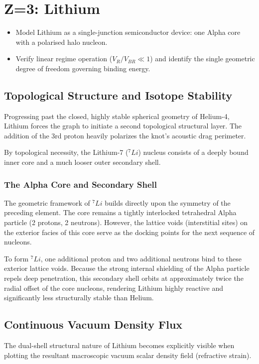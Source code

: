 \chapter{Z=3: Lithium}
\label{ch:lithium}


\begin{objectivebox}
\begin{itemize}
    \item Model Lithium as a single-junction semiconductor device: one Alpha core with a polarised halo nucleon.
    \item Verify linear regime operation ($V_R/V_{BR} \ll 1$) and identify the single geometric degree of freedom governing binding energy.
\end{itemize}
\end{objectivebox}

\section{Topological Structure and Isotope Stability}
Progressing past the closed, highly stable spherical geometry of Helium-4, Lithium forces the graph to initiate a second topological structural layer. The addition of the 3rd proton heavily polarizes the knot's acoustic drag perimeter.

By topological necessity, the Lithium-7 ($^7Li$) nucleus consists of a deeply bound inner core and a much looser outer secondary shell.

\subsection{The Alpha Core and Secondary Shell}
The geometric framework of $^7Li$ builds directly upon the symmetry of the preceding element. The core remains a tightly interlocked tetrahedral Alpha particle (2 protons, 2 neutrons). However, the lattice voids (interstitial sites) on the exterior facies of this core serve as the docking points for the next sequence of nucleons.

To form $^7Li$, one additional proton and two additional neutrons bind to these exterior lattice voids. Because the strong internal shielding of the Alpha particle repels deep penetration, this secondary shell orbits at approximately twice the radial offset of the core nucleons, rendering Lithium highly reactive and significantly less structurally stable than Helium.

\section{Continuous Vacuum Density Flux}
The dual-shell structural nature of Lithium becomes explicitly visible when plotting the resultant macroscopic vacuum scalar density field (refractive strain). 

